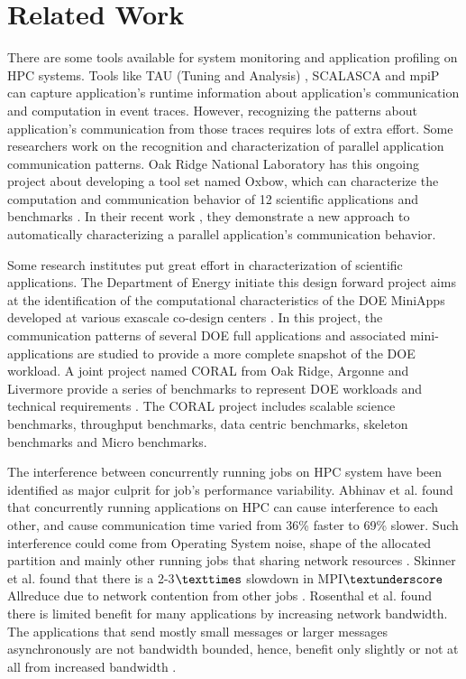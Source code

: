 \documentclass[conference]{IEEEtran}
\begin{document}
\section{Related Work}
\label{sec:related_work}
There are some tools available for system monitoring and application profiling on HPC systems. Tools like TAU (Tuning and Analysis) \cite{tau}, SCALASCA \cite{scala} and mpiP \cite{mpip} can capture application's runtime information about application's communication and computation in event traces. However, recognizing the patterns about application's communication from those traces requires lots of extra effort. Some researchers work on the recognition and characterization of parallel application communication patterns. Oak Ridge National Laboratory has this ongoing project about developing a tool set named Oxbow, which can characterize the computation and communication behavior of 12 scientific applications and benchmarks \cite{oxbow}. In their recent work \cite{roth}, they demonstrate a new approach to automatically characterizing a parallel application's communication behavior. 

Some research institutes put great effort in characterization of scientific applications. The Department of Energy initiate this design forward project aims at the identification of the computational characteristics of the DOE MiniApps developed at various exascale co-design centers \cite{design forward webpage}. In this project, the communication patterns of several DOE full applications and associated mini-applications are studied to provide a more complete snapshot of the DOE workload. A joint project named CORAL from Oak Ridge, Argonne and Livermore provide a series of benchmarks to represent DOE workloads and technical requirements \cite{coral}. The CORAL project includes scalable science benchmarks, throughput benchmarks, data centric benchmarks, skeleton benchmarks and Micro benchmarks.  

The interference between concurrently running jobs on HPC system have been identified as major culprit for job's performance variability. Abhinav et al. found that concurrently running applications on HPC can cause interference to each other, and cause communication time varied from 36\% faster to 69\% slower. Such interference could come from Operating System noise, shape of the allocated partition and mainly other running jobs that sharing network resources \cite{abhinav-sc13}. Skinner et al. found that  there is a 2-3$\texttimes$ slowdown in MPI$\textunderscore$Allreduce due to network contention from other jobs \cite{skinner}. Rosenthal et al. found there is limited benefit for many applications by increasing network bandwidth. The applications that send mostly small messages or larger messages asynchronously are not bandwidth bounded, hence, benefit only slightly or not at all from increased bandwidth \cite{rosenthal}.
\end{document}

